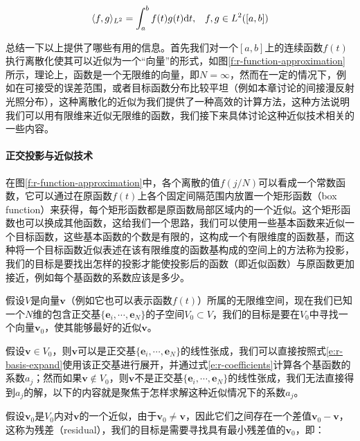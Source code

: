 \begin{equation}\label{e:r-l2-inner-product}
\begin{aligned}
	\langle f,g\rangle_{L^{2}}=\int^{b}_a f(t)g(t){\rm d}t, && f,g\in L^{2}([a,b])
\end{aligned}
\end{equation}

总结一下以上提供了哪些有用的信息。首先我们对一个$[a,b]$上的连续函数$f(t)$执行离散化使其可以近似为一个“向量”的形式，如图\ref{f:r-function-approximation}所示，理论上，函数是一个无限维的向量，即$N=\infty$，然而在一定的情况下，例如在可接受的误差范围，或者目标函数分布比较平坦（例如本章讨论的间接漫反射光照分布），这种离散化的近似为我们提供了一种高效的计算方法，这种方法说明我们可以用有限维来近似无限维的函数，我们接下来具体讨论这种近似技术相关的一些内容。




\paragraph{正交投影与近似技术}
在图\ref{f:r-function-approximation}中，各个离散的值$f(j/N)$可以看成一个常数函数，它可以通过在原函数$f(t)$上各个固定间隔范围内放置一个矩形函数（box function）来获得，每个矩形函数都是原函数局部区域内的一个近似。这个矩形函数也可以换成其他函数，这给我们一个思路，我们可以使用一些基本函数来近似一个目标函数，这些基本函数的个数是有限的，这构成一个有限维度的函数基，而这种将一个目标函数近似表述在该有限维度的函数基构成的空间上的方法称为投影，我们的目标是要找出怎样的投影才能使投影后的函数（即近似函数）与原函数更加接近，例如每个基函数的系数应该是多少。

假设$V$是向量$\mathbf{v}$（例如它也可以表示函数$f(t)$）所属的无限维空间，现在我们已知一个$N$维的包含正交基$\{\mathbf{e}_i,\cdots,\mathbf{e}_N\}$的子空间$V_0\subset V$，我们的目标是要在$V_0$中寻找一个向量$\mathbf{v}_0$，使其能够最好的近似$\mathbf{v}$。

假设$\mathbf{v}\in V_0$，则$\mathbf{v}$可以是正交基$\{\mathbf{e}_i,\cdots,\mathbf{e}_N\}$的线性张成，我们可以直接按照式\ref{e:r-basis-expand}使用该正交基进行展开，并通过式\ref{e:r-coefficients}计算各个基函数的系数$a_j$；然而如果$\mathbf{v}\notin V_0$，则$\mathbf{v}$不是正交基$\{\mathbf{e}_i,\cdots,\mathbf{e}_N\}$的线性张成，我们无法直接得到$a_j$的解，以下的内容就是聚焦于怎样求解这种近似情况下的系数$a_j$。

假设$\mathbf{v}_0$是$V_0$内对$\mathbf{v}$的一个近似，由于$\mathbf{v}_0\neq\mathbf{v}$，因此它们之间存在一个差值$\mathbf{v}_0-\mathbf{v}$，这称为残差（residual），我们的目标是需要寻找具有最小残差值的$\mathbf{v}_0$，即：

